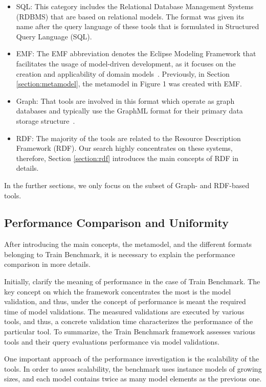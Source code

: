 \begin{itemize}
	\item SQL: This category includes the Relational Database Management Systems (RDBMS) that are based on relational models. The format was given its name after the query language of these tools that is formulated in Structured Query Language (SQL).
	\item EMF: The EMF abbreviation denotes the Eclipse Modeling Framework that facilitates the usage of model-driven development,
	as it focuses on the creation and applicability of domain models~\cite{emf}. Previously, in Section \ref{section:metamodel}, the metamodel in Figure 1 %
	was created with EMF.
	\item Graph: That tools are involved in this format which operate as graph databases and typically use the GraphML format for their primary data storage structure~\cite{graphml}.
	\item RDF: The majority of the tools are related to the Resource Description Framework (RDF). Our search highly concentrates on these systems, therefore, Section \ref{section:rdf} introduces the main concepts of RDF in details.
\end{itemize}

In the further sections, we only focus on the subset of Graph- and RDF-based tools.

\subsection{Performance Comparison and Uniformity}

After introducing the main concepts, the metamodel, and the different formats belonging to Train Benchmark, it is necessary to explain the performance comparison in more details.

Initially, clarify the meaning of performance in the case of Train Benchmark. The key concept on which the framework concentrates the most is the model validation, and thus, under the concept of performance is meant the required time of model validations. The measured validations are executed by various tools, and thus, a concrete validation time characterizes the performance of the particular tool. To summarize, the Train Benchmark framework assesses various tools and their query evaluations performance via model validations.

One important approach of the performance investigation is the scalability of the tools. In order to asses scalability, the benchmark uses instance models of growing sizes, and each model contains twice as many model elements as the previous one.

